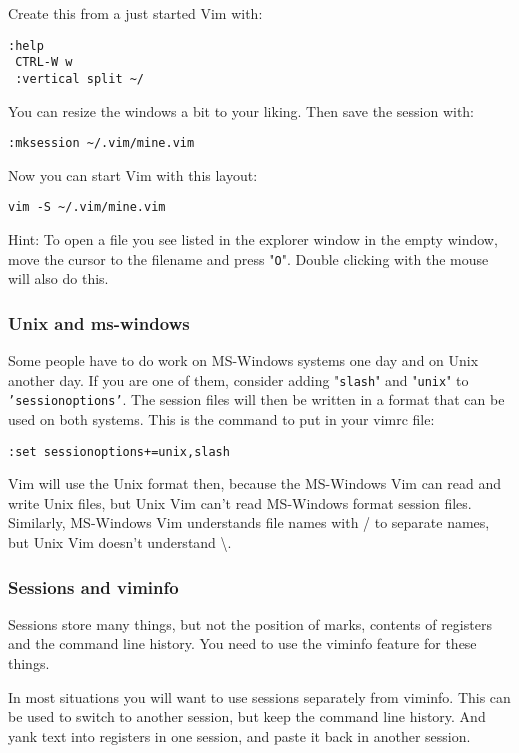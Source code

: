 Create this from a just started Vim with:

\begin{Verbatim}[samepage=true]
 :help
 CTRL-W w
 :vertical split ~/
\end{Verbatim}

You can resize the windows a bit to your liking.
Then save the session with:

\begin{Verbatim}[samepage=true]
 :mksession ~/.vim/mine.vim
\end{Verbatim}

Now you can start Vim with this layout:

\begin{Verbatim}[samepage=true]
 vim -S ~/.vim/mine.vim
\end{Verbatim}

Hint: To open a file you see listed in the explorer window in the empty window, move the cursor to the filename and press "\texttt{O}".
Double clicking with the mouse will also do this.

\subsubsection{Unix and ms-windows}
Some people have to do work on MS-Windows systems one day and on Unix another day.
If you are one of them, consider adding "\texttt{slash}" and "\texttt{unix}" to \texttt{'sessionoptions'}.
The session files will then be written in a format that can be used on both systems.
This is the command to put in your vimrc file:

\begin{Verbatim}[samepage=true]
 :set sessionoptions+=unix,slash
\end{Verbatim}

Vim will use the Unix format then, because the MS-Windows Vim can read and write Unix files, but Unix Vim can't read MS-Windows format session files.
Similarly, MS-Windows Vim understands file names with / to separate names, but Unix Vim doesn't understand \textbackslash.
\subsubsection{Sessions and viminfo}
Sessions store many things, but not the position of marks, contents of registers and the command line history.
You need to use the viminfo feature for these things.

In most situations you will want to use sessions separately from viminfo.
This can be used to switch to another session, but keep the command line history.
And yank text into registers in one session, and paste it back in another session.

